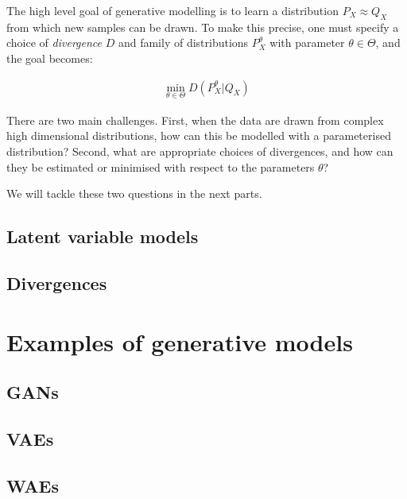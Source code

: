 The high level goal of generative modelling is to learn a distribution $P_X \approx Q_X$ from which new samples can be drawn. 
To make this precise, one must specify a choice of \emph{divergence} $D$ and family of distributions $P_X^\theta$ with parameter $\theta\in\Theta$, and the goal becomes:

\begin{align*}
\min_{\theta \in \Theta} D\left(P_X^\theta | Q_X \right)
\end{align*}

There are two main challenges.
First, when the data are drawn from complex high dimensional distributions, how can this be modelled with a parameterised distribution?
Second, what are appropriate choices of divergences, and how can they be estimated or minimised with respect to the parameters $\theta$?

We will tackle these two questions in the next parts. 

\subsection{Latent variable models}

\subsection{Divergences}


\section{Examples of generative models}

\subsection{GANs}
\subsection{VAEs}
\subsection{WAEs}

